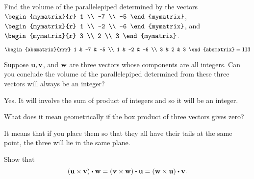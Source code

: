 \begin{enumialphparenastyle}

\begin{ex} Find the volume of the parallelepiped determined by the vectors
$\begin{mymatrix}{r}
1 \\
-7 \\
-5
\end{mymatrix} $, \\
 $\begin{mymatrix}{r}
1 \\
-2 \\
-6
\end{mymatrix}$, and $\begin{mymatrix}{r}
3 \\
2 \\
3
\end{mymatrix}$.
\begin{sol}
 $\begin{absmatrix}{rrr}
1 & -7 & -5 \\
1 & -2 & -6 \\
3 & 2 & 3
\end{absmatrix}= 113$
\end{sol}
\end{ex}

\begin{ex} Suppose $\mbox{\bf u},\mbox{\bf v}$, and $\mbox{\bf w}$ are three vectors whose
components are all integers. Can you conclude the volume of the
parallelepiped determined from these three vectors will always be an integer?
\begin{sol}
Yes. It will involve the sum of product of integers and so it will
be an integer.
\end{sol}
\end{ex}

\begin{ex} \label{exer-box-product-zero} What does it mean geometrically if the box
product of three vectors gives zero?
\begin{sol}
It means that if you place them so that
they all have their tails at the same point, the three will lie in the same
plane.
\end{sol}
\end{ex}

\begin{ex} Show that 
  \begin{equation*}
    \tup{\vect{u}\times \vect{v}} \dotprod \vect{w}=
    \tup{\vect{v}\times \vect{w}} \dotprod \vect{u}=
    \tup{\vect{w}\times \vect{u}} \dotprod \vect{v}.
  \end{equation*}
\end{ex}


\end{enumialphparenastyle}
